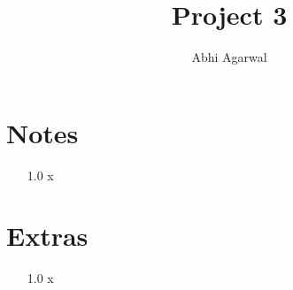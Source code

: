 \documentclass[11pt, oneside]{article}
\title{Project 3}
\author{Abhi Agarwal}
\date{}
\begin{document}
\maketitle

\section*{Notes}

\begin{enumerate}
\item[1.0] x
\end{enumerate}

\section*{Extras}

\begin{enumerate}
\item[1.0] x
\end{enumerate}
\end{document}
